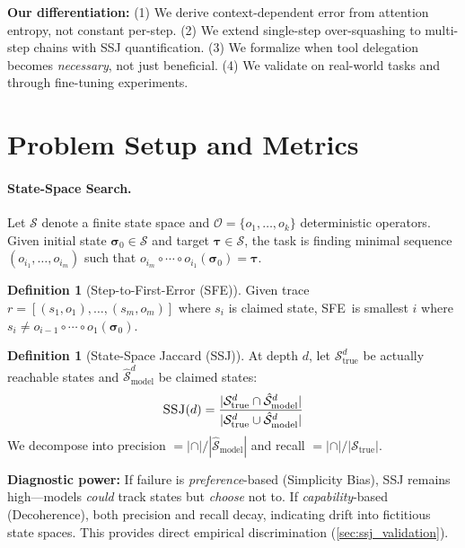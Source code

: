 \documentclass{article}
\theoremstyle{plain}
\theoremstyle{definition}
\newtheorem{definition}[theorem]{Definition}
\theoremstyle{remark}
\newcommand{\state}{\boldsymbol{\sigma}}
\newcommand{\target}{\boldsymbol{\tau}}
\newcommand{\ops}{\mathcal{O}}
\newcommand{\sfe}{\textsc{SFE}}
\newcommand{\ssj}{\textsc{SSJ}}
\begin{document}
\textbf{Our differentiation:} (1) We derive context-dependent error from attention entropy, not constant per-step. (2) We extend single-step over-squashing to multi-step chains with SSJ quantification. (3) We formalize when tool delegation becomes \emph{necessary}, not just beneficial. (4) We validate on real-world tasks and through fine-tuning experiments.


\section{Problem Setup and Metrics}
\label{sec:prelim}

\paragraph{State-Space Search.} Let $\mathcal{S}$ denote a finite state space and $\ops = \{o_1, \ldots, o_k\}$ deterministic operators. Given initial state $\state_0 \in \mathcal{S}$ and target $\target \in \mathcal{S}$, the task is finding minimal sequence $(o_{i_1}, \ldots, o_{i_m})$ such that $o_{i_m} \circ \cdots \circ o_{i_1}(\state_0) = \target$.

\begin{definition}[Step-to-First-Error (\sfe)]
Given trace $r = [(s_1, o_1), \ldots, (s_m, o_m)]$ where $s_i$ is claimed state, \sfe\ is smallest $i$ where $s_i \neq o_{i-1} \circ \cdots \circ o_1(\state_0)$.
\end{definition}

\begin{definition}[State-Space Jaccard (\ssj)]
\label{def:ssj}
At depth $d$, let $\mathcal{S}_\text{true}^d$ be actually reachable states and $\hat{\mathcal{S}}_\text{model}^d$ be claimed states:
\begin{equation}
\ssj(d) = \frac{|\mathcal{S}_\text{true}^d \cap \hat{\mathcal{S}}_\text{model}^d|}{|\mathcal{S}_\text{true}^d \cup \hat{\mathcal{S}}_\text{model}^d|}
\end{equation}
We decompose into precision $= |\cap|/|\hat{\mathcal{S}}_\text{model}|$ and recall $= |\cap|/|\mathcal{S}_\text{true}|$.
\end{definition}

\textbf{Diagnostic power:} If failure is \emph{preference}-based (Simplicity Bias), SSJ remains high---models \emph{could} track states but \emph{choose} not to. If \emph{capability}-based (Decoherence), both precision and recall decay, indicating drift into fictitious state spaces. This provides direct empirical discrimination (\cref{sec:ssj_validation}).
\end{document}

